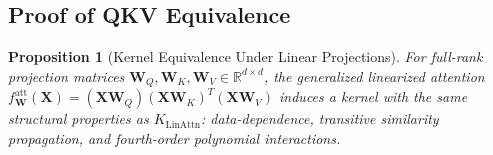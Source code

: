 \documentclass{article}
\theoremstyle{plain}
\newtheorem{proposition}[theorem]{Proposition}
\theoremstyle{definition}
\theoremstyle{remark}
\newcommand{\R}{\mathbb{R}}
\begin{document}
\subsection{Proof of QKV Equivalence}

\begin{proposition}[Kernel Equivalence Under Linear Projections]
\label{prop:qkv_equivalence}
For full-rank projection matrices $\mathbf{W}_Q, \mathbf{W}_K, \mathbf{W}_V \in \R^{d \times d}$, the generalized linearized attention $f^{\text{att}}_{\mathbf{W}}(\mathbf{X}) = (\mathbf{X}\mathbf{W}_Q)(\mathbf{X}\mathbf{W}_K)^T(\mathbf{X}\mathbf{W}_V)$ induces a kernel with the same structural properties as $K_{\text{LinAttn}}$: data-dependence, transitive similarity propagation, and fourth-order polynomial interactions.
\end{proposition}
\end{document}
